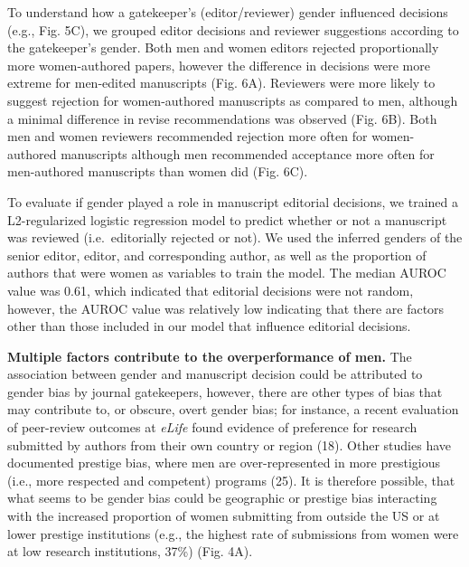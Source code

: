 \documentclass[11pt,]{article}
\begin{document}
To understand how a gatekeeper's (editor/reviewer) gender influenced
decisions (e.g., Fig. 5C), we grouped editor decisions and reviewer
suggestions according to the gatekeeper's gender. Both men and women
editors rejected proportionally more women-authored papers, however the
difference in decisions were more extreme for men-edited manuscripts
(Fig. 6A). Reviewers were more likely to suggest rejection for
women-authored manuscripts as compared to men, although a minimal
difference in revise recommendations was observed (Fig. 6B). Both men
and women reviewers recommended rejection more often for women-authored
manuscripts although men recommended acceptance more often for
men-authored manuscripts than women did (Fig. 6C).

To evaluate if gender played a role in manuscript editorial decisions,
we trained a L2-regularized logistic regression model to predict whether
or not a manuscript was reviewed (i.e.~editorially rejected or not). We
used the inferred genders of the senior editor, editor, and
corresponding author, as well as the proportion of authors that were
women as variables to train the model. The median AUROC value was 0.61,
which indicated that editorial decisions were not random, however, the
AUROC value was relatively low indicating that there are factors other
than those included in our model that influence editorial decisions.

\textbf{Multiple factors contribute to the overperformance of men.} The
association between gender and manuscript decision could be attributed
to gender bias by journal gatekeepers, however, there are other types of
bias that may contribute to, or obscure, overt gender bias; for
instance, a recent evaluation of peer-review outcomes at \emph{eLife}
found evidence of preference for research submitted by authors from
their own country or region (18). Other studies have documented prestige
bias, where men are over-represented in more prestigious (i.e., more
respected and competent) programs (25). It is therefore possible, that
what seems to be gender bias could be geographic or prestige bias
interacting with the increased proportion of women submitting from
outside the US or at lower prestige institutions (e.g., the highest rate
of submissions from women were at low research institutions, 37\%) (Fig.
4A).
\end{document}
